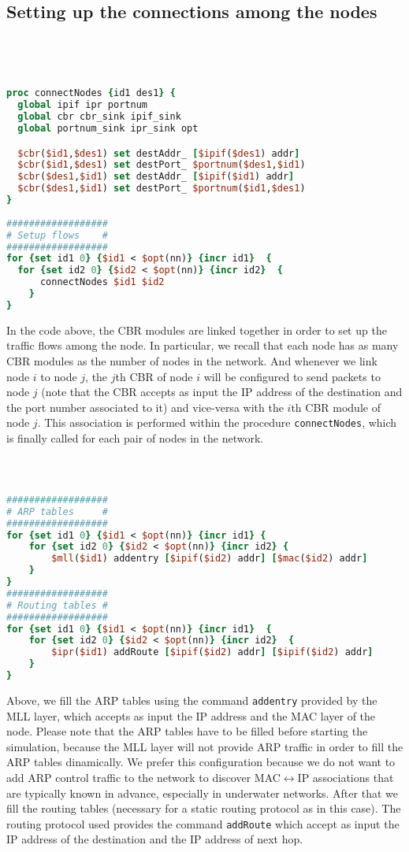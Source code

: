 \documentclass[11pt]{article}
\begin{document}
\subsection{Setting up the connections among the nodes}
\ 
{\scriptsize\tt
\begin{lstlisting}[language=tcl]
proc connectNodes {id1 des1} {
  global ipif ipr portnum 
  global cbr cbr_sink ipif_sink 
  global portnum_sink ipr_sink opt 

  $cbr($id1,$des1) set destAddr_ [$ipif($des1) addr]
  $cbr($id1,$des1) set destPort_ $portnum($des1,$id1)
  $cbr($des1,$id1) set destAddr_ [$ipif($id1) addr]
  $cbr($des1,$id1) set destPort_ $portnum($id1,$des1) 
}
    
##################
# Setup flows    #
##################
for {set id1 0} {$id1 < $opt(nn)} {incr id1}  {
  for {set id2 0} {$id2 < $opt(nn)} {incr id2}  {
	  connectNodes $id1 $id2
	}
}
\end{lstlisting}
}
In the code above, the CBR modules are linked together in order to set up the traffic flows among the node. In particular, we recall that each node has as many CBR modules as the number of nodes in the network. And whenever we link node $i$ to node $j$, the $j$th CBR of node $i$ will be configured to send packets to node $j$ (note that the CBR accepts as input the IP address of the destination and the port number associated to it) and vice-versa with the $i$th CBR module of node $j$. This association is performed within the procedure {\tt connectNodes}, which is finally called for each pair of nodes in the network.\\



{\scriptsize\tt
\begin{lstlisting}[language=tcl]

##################
# ARP tables     #
##################
for {set id1 0} {$id1 < $opt(nn)} {incr id1} {
    for {set id2 0} {$id2 < $opt(nn)} {incr id2} {
        $mll($id1) addentry [$ipif($id2) addr] [$mac($id2) addr]
    }
}
##################
# Routing tables #
##################
for {set id1 0} {$id1 < $opt(nn)} {incr id1}  {
    for {set id2 0} {$id2 < $opt(nn)} {incr id2}  {
        $ipr($id1) addRoute [$ipif($id2) addr] [$ipif($id2) addr]
    }
}
\end{lstlisting}
}

Above, we fill the ARP tables using the command {\tt addentry} provided by the MLL layer, which accepts as input the IP address and the MAC layer of the node. Please note that the ARP tables have to be filled before starting the simulation, because the MLL layer will not provide ARP traffic in order to fill the ARP tables dinamically. We prefer this configuration because we do not want to add ARP control traffic to the network to discover MAC$\leftrightarrow$IP associations that are typically known in advance, especially in underwater networks.
After that we fill the routing tables (necessary for a static routing protocol as in this case). The routing protocol used provides the command {\tt addRoute} which accept as input the IP address of the destination and the IP address of next hop.
\end{document}
